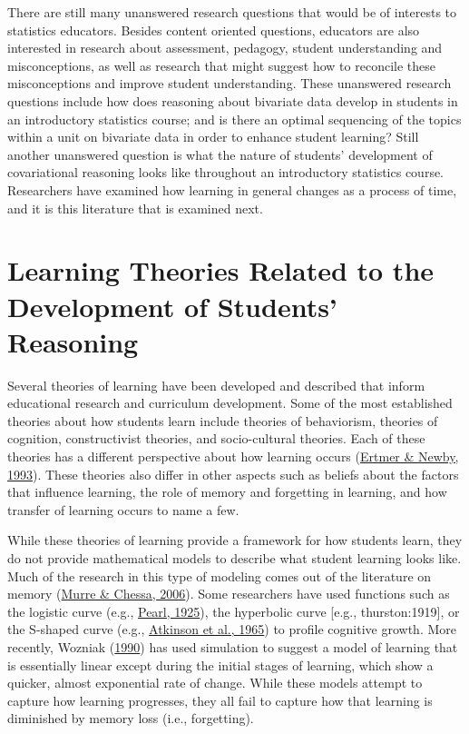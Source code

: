 \documentclass[11pt]{umnthesis}
\begin{document}
There are still many unanswered research questions that would be of interests to statistics educators. Besides content oriented questions, educators are also interested in research about assessment, pedagogy, student understanding and misconceptions, as well as research that might suggest how to reconcile these misconceptions and improve student understanding. These unanswered research questions include how does reasoning about bivariate data develop in students in an introductory statistics course; and is there an optimal sequencing of the topics within a unit on bivariate data in order to enhance student learning? Still another unanswered question is what the nature of students' development of covariational reasoning looks like throughout an introductory statistics course. Researchers have examined how learning in general changes as a process of time, and it is this literature that is examined next.

\hypertarget{learning-theories-related-to-the-development-of-students-reasoning}{%
\section{Learning Theories Related to the Development of Students' Reasoning}\label{learning-theories-related-to-the-development-of-students-reasoning}}

Several theories of learning have been developed and described that inform educational research and curriculum development. Some of the most established theories about how students learn include theories of behaviorism, theories of cognition, constructivist theories, and socio-cultural theories. Each of these theories has a different perspective about how learning occurs (\protect\hyperlink{ref-ertmer:1993}{Ertmer \& Newby, 1993}). These theories also differ in other aspects such as beliefs about the factors that influence learning, the role of memory and forgetting in learning, and how transfer of learning occurs to name a few.

While these theories of learning provide a framework for how students learn, they do not provide mathematical models to describe what student learning looks like. Much of the research in this type of modeling comes out of the literature on memory (\protect\hyperlink{ref-murre:2006}{Murre \& Chessa, 2006}). Some researchers have used functions such as the logistic curve (e.g., \protect\hyperlink{ref-pearl:1925}{Pearl, 1925}), the hyperbolic curve {[}e.g., thurston:1919{]}, or the S-shaped curve (e.g., \protect\hyperlink{ref-atkinson:1965}{Atkinson et al., 1965}) to profile cognitive growth. More recently, Wozniak (\protect\hyperlink{ref-wozniak:1990}{1990}) has used simulation to suggest a model of learning that is essentially linear except during the initial stages of learning, which show a quicker, almost exponential rate of change. While these models attempt to capture how learning progresses, they all fail to capture how that learning is diminished by memory loss (i.e., forgetting).
\end{document}
